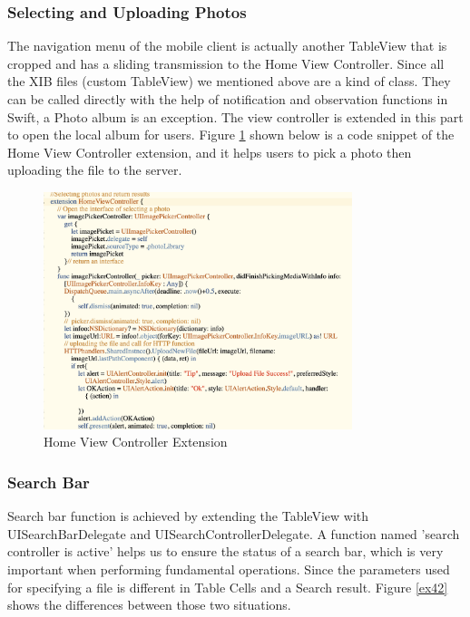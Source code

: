 \documentclass{article}
\begin{document}
\subsubsection{Selecting and Uploading Photos}

The navigation menu of the mobile client is actually another TableView that is cropped and has a sliding transmission to the Home View Controller. Since all the XIB files (custom TableView) we mentioned above are a kind of class. They can be called directly with the help of notification and observation functions in Swift, a Photo album is an exception. The view controller is extended in this part to open the local album for users. Figure \ref{ex41} shown below is a code snippet of the Home View Controller extension, and it helps users to pick a photo then uploading the file to the server. 

\begin{figure}[H]
\begin{center}
\includegraphics[width=9cm]{33.png}
\end{center}
\caption{Home View Controller Extension}\label{ex41}
\end{figure}
 
\subsubsection{Search Bar}

Search bar function is achieved by extending the TableView with UISearchBarDelegate and UISearchControllerDelegate. A function named 'search controller is active' helps us to ensure the status of a search bar, which is very important when performing fundamental operations. Since the parameters used for specifying a file is different in Table Cells and a Search result. Figure \ref{ex42} shows the differences between those two situations.
\end{document}
